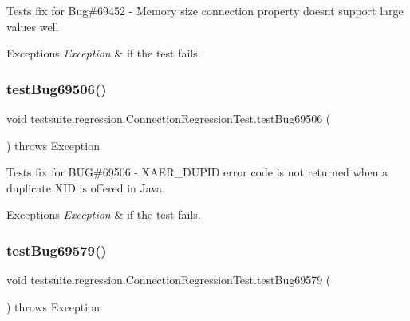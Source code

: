 Tests fix for Bug\#69452 -\/ Memory size connection property doesn\textquotesingle{}t support large values well


\begin{DoxyExceptions}{Exceptions}
{\em Exception} & if the test fails. \\
\hline
\end{DoxyExceptions}
\mbox{\label{classtestsuite_1_1regression_1_1_connection_regression_test_ac8bd9a129a96fb8c9d9c220369e1a5b2}} 
\subsubsection{\texorpdfstring{test\+Bug69506()}{testBug69506()}}
{\footnotesize\ttfamily void testsuite.\+regression.\+Connection\+Regression\+Test.\+test\+Bug69506 (\begin{DoxyParamCaption}{ }\end{DoxyParamCaption}) throws Exception}

Tests fix for B\+UG\#69506 -\/ X\+A\+E\+R\+\_\+\+D\+U\+P\+ID error code is not returned when a duplicate X\+ID is offered in Java.


\begin{DoxyExceptions}{Exceptions}
{\em Exception} & if the test fails. \\
\hline
\end{DoxyExceptions}
\mbox{\label{classtestsuite_1_1regression_1_1_connection_regression_test_a09e5aef6835aa4e8cf07bde4c3d06a28}} 
\subsubsection{\texorpdfstring{test\+Bug69579()}{testBug69579()}}
{\footnotesize\ttfamily void testsuite.\+regression.\+Connection\+Regression\+Test.\+test\+Bug69579 (\begin{DoxyParamCaption}{ }\end{DoxyParamCaption}) throws Exception}

